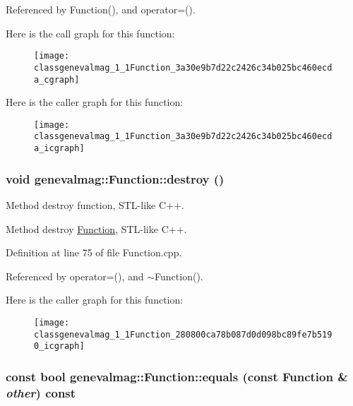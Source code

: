 Referenced by Function(), and operator=().

Here is the call graph for this function:\nopagebreak
\begin{figure}[H]
\begin{center}
\leavevmode
\texttt{[image: classgenevalmag\_1\_1Function\_3a30e9b7d22c2426c34b025bc460ecda\_cgraph]}
\end{center}
\end{figure}


Here is the caller graph for this function:\nopagebreak
\begin{figure}[H]
\begin{center}
\leavevmode
\texttt{[image: classgenevalmag\_1\_1Function\_3a30e9b7d22c2426c34b025bc460ecda\_icgraph]}
\end{center}
\end{figure}
\hypertarget{classgenevalmag_1_1Function_280800ca78b087d0d098bc89fe7b5190}{
\subsubsection[{destroy}]{\setlength{\rightskip}{0pt plus 5cm}void genevalmag::Function::destroy ()}}
\label{classgenevalmag_1_1Function_280800ca78b087d0d098bc89fe7b5190}


Method destroy function, STL-like C++.

Method destroy \hyperlink{classgenevalmag_1_1Function}{Function}, STL-like C++. 

Definition at line 75 of file Function.cpp.

Referenced by operator=(), and $\sim$Function().

Here is the caller graph for this function:\nopagebreak
\begin{figure}[H]
\begin{center}
\leavevmode
\texttt{[image: classgenevalmag\_1\_1Function\_280800ca78b087d0d098bc89fe7b5190\_icgraph]}
\end{center}
\end{figure}
\hypertarget{classgenevalmag_1_1Function_4a9007a5fc8a9e4781144b580e127109}{
\subsubsection[{equals}]{\setlength{\rightskip}{0pt plus 5cm}const bool genevalmag::Function::equals (const {\bf Function} \& {\em other}) const}}
\label{classgenevalmag_1_1Function_4a9007a5fc8a9e4781144b580e127109}


